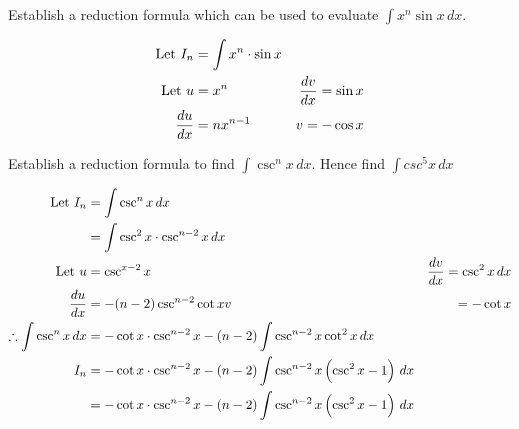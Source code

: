 \documentclass{standalone}
\begin{document}
	\begin{example}
		Establish a reduction formula which can be used to evaluate $\int x^n \sin x \, dx$.
	\end{example}
	
	\begin{align*}
		\text{Let } I_n &= \int x^n \cdot \sin x\\
		\text{Let } u & = x^n      & \frac{dv}{dx} = \sin x \\
		\frac{du}{dx}     & = nx^{n-1} & v= -\cos x         
	\end{align*}
	
	\begin{example}
		Establish a reduction formula to find $\int \csc^nx \, dx$. Hence find $\int csc^5x \, dx$
	\end{example}
	\begin{align*}
		\text{Let } I_n &= \int \csc^nx \, dx\\
		&= \int \csc^2x \cdot \csc^{n-2}x \, dx\\
		\text{Let } u & = \csc^{x-2} x              & \frac{dv}{dx} = \csc^2x \, dx \\
		\frac{du}{dx}     & = -(n-2)\csc^{n-2}\cot x  v & = -\cot x                 \\
		\therefore \int \csc^nx \, dx &= -\cot x \cdot \csc^{n-2}x  - (n-2)\int \csc^{n-2}x\cot^2x \, dx\\
		I_n &= 	-\cot x \cdot \csc^{n-2}x - (n-2)\int \csc^{n-2}x\left(\csc^2x - 1\right) \, dx\\
		&= 		-\cot x \cdot \csc^{n-2}x - (n-2)\int \csc^{n-2}x\left(\csc^2x - 1\right) \, dx\\
	\end{align*}
\end{document}
